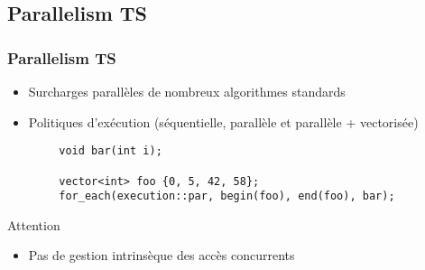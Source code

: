 \documentclass[C++.tex]{subfiles}
\begin{document}
\begin{frame}[fragile]

\end{frame}

\subsection*{Parallelism TS}
\begin{frame}[fragile]
	\frametitle{Parallelism TS}
	\begin{itemize}
		\item Surcharges parallèles de nombreux algorithmes standards
		\item Politiques d'exécution (séquentielle, parallèle et parallèle + vectorisée)
	\end{itemize}

	\begin{verbatim}
		void bar(int i);

		vector<int> foo {0, 5, 42, 58};
		for_each(execution::par, begin(foo), end(foo), bar);
	\end{verbatim}

	\begin{alertblock}{Attention}
		\begin{itemize}
			\item Pas de gestion intrinsèque des accès concurrents
		\end{itemize}
	\end{alertblock}

\end{frame}
\end{document}
